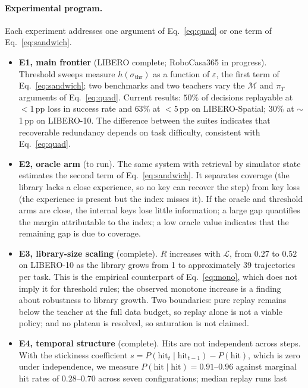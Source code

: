 \documentclass{article}
\begin{document}
\newpage

\paragraph{Experimental program.}
Each experiment addresses one argument of Eq.~\ref{eq:quad} or one term of
Eq.~\ref{eq:sandwich}.
\begin{itemize}[leftmargin=1.3em, itemsep=0.35em, topsep=0.3em]
\item \textbf{E1, main frontier} (LIBERO complete; RoboCasa365 in progress).
Threshold sweeps measure $h(\sigma_{\mathrm{thr}})$ as a function of
$\varepsilon$, the first term of Eq.~\ref{eq:sandwich}; two benchmarks and two
teachers vary the $\mathcal{M}$ and $\pi_T$ arguments of Eq.~\ref{eq:quad}.
Current results: $50\%$ of decisions replayable at $<$1\,pp loss in success
rate and $63\%$ at $<$5\,pp on LIBERO-Spatial; $30\%$ at $\sim$1\,pp on
LIBERO-10. The difference between the suites indicates that recoverable
redundancy depends on task difficulty, consistent with Eq.~\ref{eq:quad}.
\item \textbf{E2, oracle arm} (to run). The same system with retrieval by
simulator state estimates the second term of Eq.~\ref{eq:sandwich}. It
separates coverage (the library lacks a close experience, so no key can
recover the step) from key loss (the experience is present but the index
misses it). If the oracle and threshold arms are close, the internal keys lose
little information; a large gap quantifies the margin attributable to the
index; a low oracle value indicates that the remaining gap is due to coverage.
\item \textbf{E3, library-size scaling} (complete). $R$ increases with
$\mathcal{L}$, from $0.27$ to $0.52$ on LIBERO-10 as the library grows from 1
to approximately 39 trajectories per task. This is the empirical counterpart
of Eq.~\ref{eq:mono}, which does not imply it for threshold rules; the
observed monotone increase is a finding about robustness to library growth.
Two boundaries: pure replay remains below the teacher at the full data budget,
so replay alone is not a viable policy; and no plateau is resolved, so
saturation is not claimed.
\item \textbf{E4, temporal structure} (complete). Hits are not independent
across steps. With the stickiness coefficient
$s = P(\mathrm{hit}_t \mid \mathrm{hit}_{t-1}) - P(\mathrm{hit})$, which is
zero under independence, we measure
$P(\mathrm{hit} \mid \mathrm{hit}) = 0.91$--$0.96$ against marginal hit rates
of $0.28$--$0.70$ across seven configurations; median replay runs last

\end{itemize}
\end{document}
